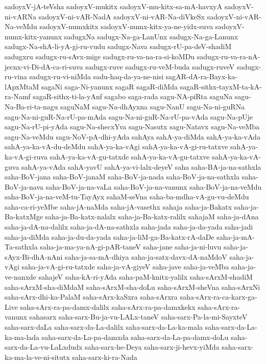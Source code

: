 {sadoyxV-jA-teVsha
sadoyxV-mukitx
sadoyxV-mu-kitx-sa-mA-havxyA
sadoyxV-ni-vARNa
sadoyxV-ni-vAR-NadA
sadoyxV-ni-vAR-Na-diVkeSx
sadoyxV-ni-vAR-Na-veMdu
sadoyxV-numxkitx
sadoyxV-numx-kitx-ya-ne-yidx-suva
sadoyxV-numx-kitx-yanunx
sadugxNa
sadugx-Na-ga-LanUnx
sadugx-Na-ga-Lanunx
sadugx-Na-shA-li-yA-gi-ru-vudu
sadugx-Nava
sadugx-rU-pa-deV-shadiM
sadugxru
sadugx-ru-sAvx-mige
sadugx-ru-va-na-ra-si-koMDu
sadugx-ru-va-ra-nA-jecnx-vi-Di-dA-ca-ri-suva
sadugx-ruve
sadugx-ru-veM-buda
sadugx-ruveV
sadugx-ru-vina
sadugx-ru-vi-niMda
sadu-haq-da-ya-ne-nisi
sagAR-dA-ra-Bayx-ka-lApxMtaM
sagaNi
saga-Ni-yanunx
sagaR
sagaR-diMda
sagaR-sithx-tayxM-ta-kA-ra-Namf
sagaR-sithx-ti-la-yAnf
sagabo
saga-rada
sagu-NA-piRta
saguNa
sagu-Na-Ba-ri-ta-nagu
saguNaM
sagu-Na-dhAyxna
sagu-NanU
sagu-Na-ni-guRNa
sagu-Na-ni-guR-Na-rU-pa-mAda
sagu-Na-ni-guR-Na-rU-pa-vAda
sagu-Na-pUje
sagu-Na-rU-pi-yAda
sagu-Na-shecxYva
sagu-Nasutx
sagu-Natavx
sagu-Na-veMba
sagu-Na-veMdu
sagu-NoV-pA-dhi-yAda
sahAya
sahA-ya-diMda
sahA-ya-ka-vAda
sahA-ya-ka-vA-du-deMdu
sahA-ya-ka-vAgi
sahA-ya-ka-vA-gi-ru-tatxve
sahA-ya-ka-vA-gi-ruva
sahA-ya-ka-vA-gu-tatxde
sahA-ya-ka-vA-gu-tatxve
sahA-ya-ka-vA-guva
sahA-ya-vAda
sahA-yavU
sahA-ya-vi-lalx-deyeV
saha
saha-BA-ja-na-sathxla
saha-BoV-jana
saha-BoV-janaM
saha-BoV-ja-nada
saha-BoV-ja-na-sathxla
saha-BoV-ja-nava
saha-BoV-ja-na-vaLa
saha-BoV-ja-na-vanunx
saha-BoV-ja-na-veMdu
saha-BoV-ja-na-veM-tu-TayAyx
sahaM-seVna
saha-ba-mdha-vA-gu-vu-deMdu
saha-ca-ri-yeMbe
saha-jA-naMda
saha-jA-vasethx
sahaja
saha-ja-Bakatx
saha-ja-Ba-katxMge
saha-ja-Ba-katx-nalalx
saha-ja-Ba-katx-ralilx
sahajaM
saha-ja-dAna
saha-ja-dA-na-dalilx
saha-ja-dA-na-sathxla
saha-jada
saha-ja-da-yada
saha-jadi
saha-ja-diMda
saha-ja-du-da-yada
saha-ja-liM-ga-Ba-katx-rA-daDe
saha-ja-mA-Ta-sathxla
saha-ja-ma-ya-nA-gi-pAR-taneV
saha-jane
saha-ja-ni-luvu
saha-ja-sAyx-Bi-dhA-nAni
saha-ja-sa-mA-dhiya
saha-ja-satx-davx-dA-naMdoV
saha-ja-vAgi
saha-ja-vA-gi-ru-tatxde
saha-ja-vA-giyeV
saha-jave
saha-ja-veMba
saha-ja-ve-nanxde
sahajeV
saha-kA-ri-yAda
saha-paM-knitx-yalilx
saha-sArxM-shadiM
saha-sArxM-sha-diMdaM
saha-sArxM-sha-doLu
saha-sArxM-sheVna
saha-sArxNi
saha-sArx-dhi-ka-PalaM
saha-sArx-kaSxra
saha-sArxra
saha-sArx-ra-ca-karx-ga-Live
saha-sArx-ra-pa-damx-dalilx
saha-sArx-ra-pa-damxkekx
saha-sArx-ra-vanunx
sahasarx
saha-sarx-Bu-ja-vu-LALx-taneV
saha-sarx-Pa-la-mi-SayxteV
saha-sarx-daLa
saha-sarx-da-La-dalilx
saha-sarx-da-La-ka-mala
saha-sarx-da-La-ka-ma-lada
saha-sarx-da-La-pa-damxda
saha-sarx-da-La-pa-damx-doLu
saha-sarx-da-La-vu-LaLxdudx
saha-sarx-he-Deya
saha-sarx-ji-hevx-yiMda
saha-sarx-ka-ma-la-ve-ni-situtx
saha-sarx-ki-ra-Nada
}
